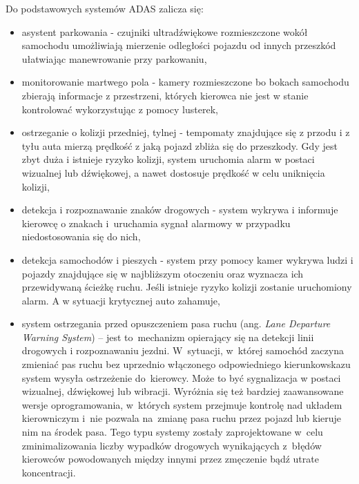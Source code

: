 Do podstawowych systemów ADAS zalicza się:
\begin{itemize}
	\item asystent parkowania - czujniki ultradźwiękowe rozmieszczone wokół samochodu umożliwiają mierzenie odległości pojazdu od innych przeszkód ułatwiając manewrowanie przy parkowaniu,
	\item monitorowanie martwego pola - kamery rozmieszczone bo bokach samochodu zbierają informacje z przestrzeni, których kierowca nie jest w stanie kontrolować wykorzystując z pomocy lusterek,
	\item ostrzeganie o kolizji przedniej, tylnej - tempomaty znajdujące się z przodu i z tyłu auta mierzą prędkość z jaką pojazd zbliża się do przeszkody. Gdy jest zbyt duża i istnieje ryzyko kolizji, system uruchomia alarm w postaci wizualnej lub dźwiękowej, a nawet dostosuje prędkość w celu uniknięcia kolizji,
	\item detekcja i rozpoznawanie znaków drogowych - system wykrywa i informuje kierowcę o znakach i~uruchamia sygnał alarmowy w przypadku niedostosowania się do nich,
	\item detekcja samochodów i pieszych - system przy pomocy kamer wykrywa ludzi i pojazdy znajdujące się w najbliższym otoczeniu oraz wyznacza ich przewidywaną ścieżkę ruchu. Jeśli istnieje ryzyko kolizji zostanie uruchomiony alarm. A w sytuacji krytycznej auto zahamuje,
	\item system ostrzegania przed opuszczeniem pasa ruchu (ang. \textit{Lane Departure Warning System}) -- jest to~mechanizm opierający się na detekcji linii drogowych i rozpoznawaniu jezdni. W~sytuacji, w~której samochód zaczyna zmieniać pas ruchu bez uprzednio włączonego odpowiedniego kierunkowskazu system wysyła ostrzeżenie do~kierowcy. Może to być sygnalizacja w postaci wizualnej, dźwiękowej lub wibracji. Wyróżnia się też bardziej zaawansowane wersje oprogramowania, w~których system przejmuje kontrolę nad układem kierowniczym i~nie pozwala na~zmianę pasa ruchu przez pojazd lub kieruje nim na środek pasa. Tego typu systemy zostały zaprojektowane w~celu zminimalizowania liczby wypadków drogowych wynikających z~błędów kierowców powodowanych między innymi przez zmęczenie bądź utrate koncentracji.
\end{itemize}

